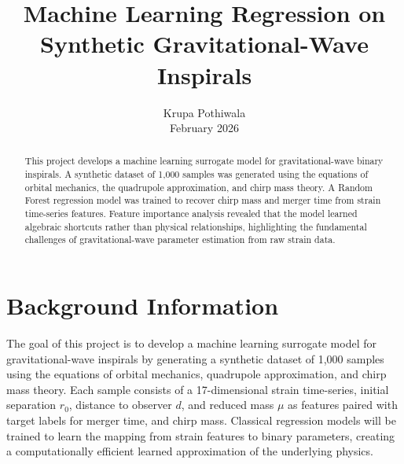 \documentclass[12pt]{article}
\title{Machine Learning Regression on Synthetic Gravitational-Wave Inspirals}
\author{Krupa Pothiwala \\[0.5em]
February 2026}
\date{}
\begin{document}
\maketitle
\begin{abstract}
This project develops a machine learning surrogate model for gravitational-wave binary inspirals. A synthetic dataset of 1,000 samples was generated using the equations of orbital mechanics, the quadrupole approximation, and chirp mass theory. A Random Forest regression model was trained to recover chirp mass and merger time from strain time-series features. Feature importance analysis revealed that the model learned algebraic shortcuts rather than physical relationships, highlighting the fundamental challenges of gravitational-wave parameter estimation from raw strain data.
\end{abstract}
\thispagestyle{empty}
\newpage

\section{Background Information}
\label{info}
The goal of this project is to develop a machine learning surrogate model for gravitational-wave inspirals by generating a synthetic dataset of 1,000 samples using the equations of orbital mechanics, quadrupole approximation, and chirp mass theory. Each sample consists of a 17-dimensional strain time-series, initial separation $r_0$, distance to observer $d$, and reduced mass $\mu$ as features paired with target labels for merger time, and chirp mass. Classical regression models will be trained to learn the mapping from strain features to binary parameters, creating a computationally efficient learned approximation of the underlying physics.
\end{document}

